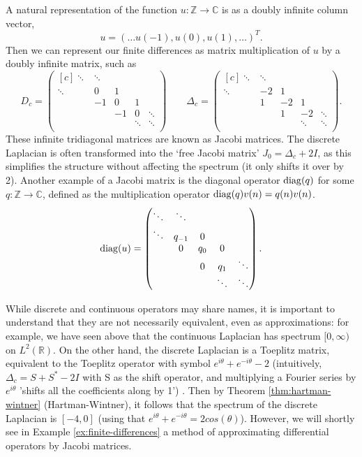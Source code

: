 \documentclass[../main.tex]{subfiles}
\begin{document}
A natural representation of the function $u: \mathbb{Z} \rightarrow \mathbb{C}$
is as a doubly infinite column vector, $$u = (\hdots u(-1), u(0), u(1),\hdots)^T.$$
Then we can represent our finite differences as matrix multiplication of $u$
by a doubly infinite matrix, such as
  $$ 
  D_c = 
  \begin{pmatrix*}[c]
    \ddots & \ddots & & & \\
    \ddots & 0 & 1 & & \\
    & -1 & 0 & 1 & \\
    & & -1 & 0 & \ddots \\
    & & & \ddots & \ddots \\
  \end{pmatrix*}
  \quad\quad
  \Delta_c = 
  \begin{pmatrix*}[c] 
    \ddots & \ddots & & & \\
    \ddots & -2 & 1 & & \\
    & 1 & -2 & 1 & \\
    & & 1 & -2 & \ddots \\
    & & & \ddots & \ddots \\
  \end{pmatrix*}. 
  $$
These infinite tridiagonal matrices are known as Jacobi matrices. The discrete
Laplacian is often transformed into the `free Jacobi matrix' $J_0 = \Delta_c +
2I$, as this simplifies the structure without affecting the spectrum (it only
shifts it over by 2). Another example of a Jacobi matrix is the diagonal
operator $\mathrm{diag}(q)$ for some $q: \mathbb{Z} \rightarrow \mathbb{C}$, defined as
the multiplication operator $\mathrm{diag}(q)v(n) = q(n)v(n)$.
  $$ 
  \diag(u) = 
  \begin{pmatrix*}[c]
    \ddots & \ddots & & & \\
    \ddots & q_{-1} & 0 & & \\
    & 0 & q_0 & 0 & \\
    & & 0 & q_1 & \ddots \\
    & & & \ddots & \ddots \\
  \end{pmatrix*}.
  $$

\begin{remark}
  While discrete and continuous operators may share names, it is important to
  understand that they are not necessarily equivalent, even as approximations:
  for example, we have seen above that the continuous Laplacian has spectrum
  $[0, \infty)$ on $L^2(\mathbb{R})$. On the other hand, the discrete Laplacian
  is a Toeplitz matrix, equivalent to the Toeplitz operator with symbol 
  $e^{i \theta} + e^{-i \theta} - 2$ (intuitively, $\Delta_c = S + S^* - 2I$ with S as the
  shift operator, and multiplying a Fourier series by $e^{i \theta}$
  'shifts all the coefficients along by 1') \cite{arveson2002short}.
  Then by Theorem \ref{thm:hartman-wintner}
  (Hartman-Wintner), it follows that the spectrum of the discrete Laplacian is
  $[-4, 0]$ (using that $e^{i \theta} + e^{-i \theta} = 2cos(\theta)$).
  However, we will shortly see in Example \ref{ex:finite-differences} a method
  of approximating differential operators by Jacobi matrices.
\end{remark}
\end{document}
